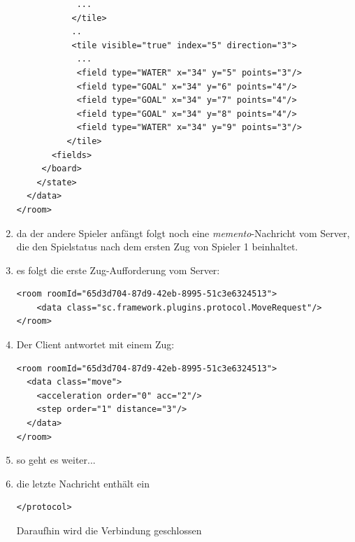 \documentclass[12pt,a4paper, ngerman, oneside]{scrartcl}
\begin{document}
\begin{enumerate}
\begin{verbatim}
            ...
           </tile>
           ..
           <tile visible="true" index="5" direction="3">
            ...
            <field type="WATER" x="34" y="5" points="3"/>
            <field type="GOAL" x="34" y="6" points="4"/>
            <field type="GOAL" x="34" y="7" points="4"/>
            <field type="GOAL" x="34" y="8" points="4"/>
            <field type="WATER" x="34" y="9" points="3"/>
          </tile>
       <fields>
     </board>
    </state>
  </data>
</room>
\end{verbatim}
\item da der andere Spieler anfängt folgt noch eine \textit{memento}-Nachricht vom Server, die den Spielstatus nach dem ersten Zug von Spieler 1 beinhaltet.
\item es folgt die erste Zug-Aufforderung vom Server: \begin{verbatim}
<room roomId="65d3d704-87d9-42eb-8995-51c3e6324513">
    <data class="sc.framework.plugins.protocol.MoveRequest"/>
</room>
\end{verbatim}
\item Der Client antwortet mit einem Zug: \begin{verbatim}
<room roomId="65d3d704-87d9-42eb-8995-51c3e6324513">
  <data class="move">
    <acceleration order="0" acc="2"/>
    <step order="1" distance="3"/>
  </data>
</room>
\end{verbatim}
\item so geht es weiter...
\item die letzte Nachricht enthält ein \begin{verbatim}
</protocol>
\end{verbatim}
Daraufhin wird die Verbindung geschlossen
\end{enumerate}
\end{document}
